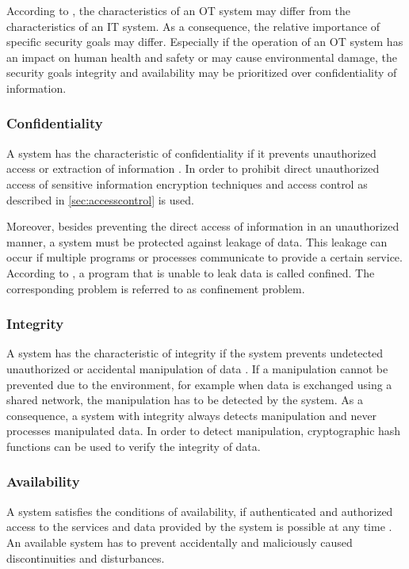 According to \citeauthor{Stouffer2023} \cite{Stouffer2023}, the characteristics of an OT system may differ from the characteristics of an IT system.
As a consequence, the relative importance of specific security goals may differ.
Especially if the operation of an OT system has an impact on human health and safety or may cause environmental damage, the security goals integrity and availability may be prioritized over confidentiality of information.

\subsubsection{Confidentiality}
A system has the characteristic of confidentiality if it prevents unauthorized access or extraction of information \cite{Eckert2023}.
In order to prohibit direct unauthorized access of sensitive information encryption techniques and access control as described in \autoref{sec:accesscontrol} is used.

Moreover, besides preventing the direct access of information in an unauthorized manner, a system must be protected against leakage of data.
This leakage can occur if multiple programs or processes communicate to provide a certain service.
According to \citeauthor{Lampson1973} \cite{Lampson1973}, a program that is unable to leak data is called confined.
The corresponding problem is referred to as confinement problem.

\subsubsection{Integrity}
A system has the characteristic of integrity if the system prevents undetected unauthorized or accidental manipulation of data \cite{Eckert2023}.
If a manipulation cannot be prevented due to the environment, for example when data is exchanged using a shared network, the manipulation has to be detected by the system.
As a consequence, a system with integrity always detects manipulation and never processes manipulated data.
In order to detect manipulation, cryptographic hash functions can be used to verify the integrity of data.

\subsubsection{Availability}
A system satisfies the conditions of availability, if authenticated and authorized access to the services and data provided by the system is possible at any time \cite{Eckert2023}.
An available system has to prevent accidentally and maliciously caused discontinuities and disturbances.

